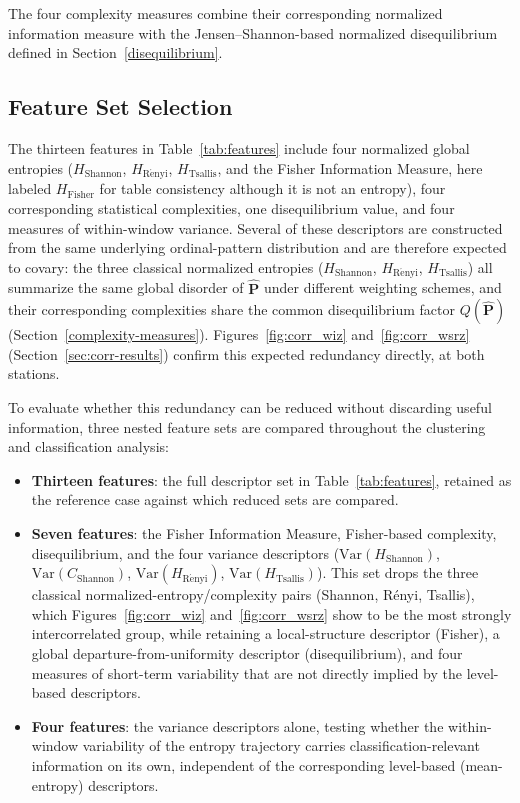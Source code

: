 \documentclass[11pt,a4paper]{article}
\begin{document}
The four complexity measures combine their corresponding normalized information measure with the Jensen--Shannon-based normalized disequilibrium defined in Section~\ref{disequilibrium}.

\subsection{Feature Set Selection}\label{sec:feature-selection}

The thirteen features in Table~\ref{tab:features} include four normalized global entropies ($H_{\mathrm{Shannon}}$, $H_{\mathrm{R\acute{e}nyi}}$, $H_{\mathrm{Tsallis}}$, and the Fisher Information Measure, here labeled $H_{\mathrm{Fisher}}$ for table consistency although it is not an entropy), four corresponding statistical complexities, one disequilibrium value, and four measures of within-window variance. Several of these descriptors are constructed from the same underlying ordinal-pattern distribution and are therefore expected to covary: the three classical normalized entropies ($H_{\mathrm{Shannon}}$, $H_{\mathrm{R\acute{e}nyi}}$, $H_{\mathrm{Tsallis}}$) all summarize the same global disorder of $\widehat{\mathbf{P}}$ under different weighting schemes, and their corresponding complexities share the common disequilibrium factor $Q(\widehat{\mathbf{P}})$ (Section~\ref{complexity-measures}). Figures~\ref{fig:corr_wiz} and~\ref{fig:corr_wsrz} (Section~\ref{sec:corr-results}) confirm this expected redundancy directly, at both stations.

To evaluate whether this redundancy can be reduced without discarding useful information, three nested feature sets are compared throughout the clustering and classification analysis:

\begin{itemize}
	\item \textbf{Thirteen features}: the full descriptor set in Table~\ref{tab:features}, retained as the reference case against which reduced sets are compared.
	\item \textbf{Seven features}: the Fisher Information Measure, Fisher-based complexity, disequilibrium, and the four variance descriptors ($\mathrm{Var}(H_{\mathrm{Shannon}})$, $\mathrm{Var}(C_{\mathrm{Shannon}})$, $\mathrm{Var}(H_{\mathrm{R\acute{e}nyi}})$, $\mathrm{Var}(H_{\mathrm{Tsallis}})$). This set drops the three classical normalized-entropy/complexity pairs (Shannon, R\'enyi, Tsallis), which Figures~\ref{fig:corr_wiz} and~\ref{fig:corr_wsrz} show to be the most strongly intercorrelated group, while retaining a local-structure descriptor (Fisher), a global departure-from-uniformity descriptor (disequilibrium), and four measures of short-term variability that are not directly implied by the level-based descriptors.
	\item \textbf{Four features}: the variance descriptors alone, testing whether the within-window variability of the entropy trajectory carries classification-relevant information on its own, independent of the corresponding level-based (mean-entropy) descriptors.
\end{itemize}
\end{document}
